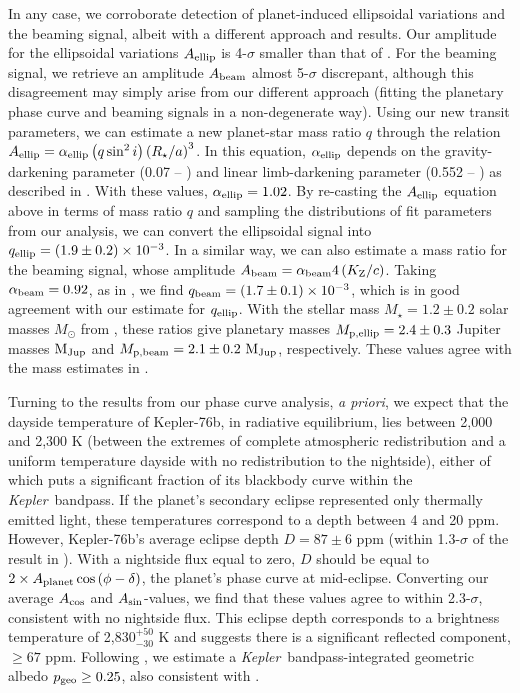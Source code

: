 \documentclass[manuscript]{aastex62}
\newcommand{\kepler}{{\it Kepler}}
\begin{document}
In any case, we corroborate detection of planet-induced ellipsoidal variations and the beaming signal, albeit with a different approach and results. Our amplitude for the ellipsoidal variations $A_{\rm ellip}$ is 4-$\sigma$ smaller than that of \citet{2013ApJ...771...26F}. For the beaming signal, we retrieve an amplitude $A_{\rm beam}$ almost 5-$\sigma$ discrepant, although this disagreement may simply arise from our different approach (fitting the planetary phase curve and beaming signals in a non-degenerate way). Using our new transit parameters, we can estimate a new planet-star mass ratio $q$ through the relation $A_{\rm ellip} = \alpha_{\rm ellip} \left( q \sin^2 i \right) \left( R_\star / a \right)^{3}$. In this equation, $\alpha_{\rm ellip}$ depends on the gravity-darkening parameter (0.07 -- \citealp{2011AA...529A..75C}) and linear limb-darkening parameter (0.552 -- \citealp{2015MNRAS.450.1879E}) as described in \citet{1985ApJ...295..143M}. With these values, $\alpha_{\rm ellip} = 1.02$. By re-casting the $A_{\rm ellip}$ equation above in terms of mass ratio $q$ and sampling the distributions of fit parameters from our analysis, we can convert the ellipsoidal signal into $q_{\rm ellip} = \left( 1.9 \pm 0.2 \right) \times 10^{-3}$. In a similar way, we can also estimate a mass ratio for the beaming signal, whose amplitude $A_{\rm beam} = \alpha_{\rm beam} 4 \left( K_{\rm Z} / c \right)$. Taking $\alpha_{\rm beam} = 0.92$, as in \citet{2013ApJ...771...26F}, we find $q_{\rm beam} = \left( 1.7\pm 0.1 \right) \times 10^{-3}$, which is in good agreement with our estimate for $q_{\rm ellip}$. With the stellar mass $M_\star = 1.2 \pm 0.2$ solar masses $M_{\odot}$ from \citet{2013ApJ...771...26F}, these ratios give planetary masses $M_{\rm p, ellip} = 2.4 \pm 0.3$ Jupiter masses ${\rm M_{Jup}}$ and $M_{\rm p, beam} = 2.1 \pm 0.2\ {\rm M_{Jup}}$, respectively. These values agree with the mass estimates in \citet{2013ApJ...771...26F}.

Turning to the results from our phase curve analysis, \emph{a priori}, we expect that the dayside temperature of Kepler-76b, in radiative equilibrium, lies between 2,000 and 2,300 K (between the extremes of complete atmospheric redistribution and a uniform temperature dayside with no redistribution to the nightside), either of which puts a significant fraction of its blackbody curve within the \kepler\ bandpass. If the planet's secondary eclipse represented only thermally emitted light, these temperatures correspond to a depth between 4 and 20 ppm. However, Kepler-76b's average eclipse depth $D = 87 \pm 6$ ppm (within 1.3-$\sigma$ of the result in  \citealt{2013ApJ...771...26F}). With a nightside flux equal to zero, $D$ should be equal to $2\times A_{\rm planet} \cos \left( \phi - \delta \right)$, the planet's phase curve at mid-eclipse. Converting our average $A_{\rm cos}$ and $A_{\rm sin}$-values, we find that these values agree to within 2.3-$\sigma$, consistent with no nightside flux. This eclipse depth corresponds to a brightness temperature of 2,830$^{+50}_{-30}$ K and suggests there is a significant reflected component, $\geq 67$ ppm. Following \citet{2011MNRAS.415.3921F}, we estimate a \kepler\ bandpass-integrated geometric albedo $p_{\rm geo} \geq 0.25$, also consistent with \citet{2013ApJ...771...26F}.
\end{document}
